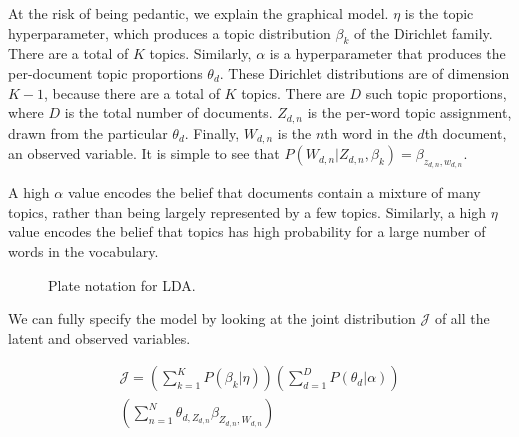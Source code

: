 \documentclass[letterpaper]{article}
\begin{document}
At the risk of being pedantic, we explain the graphical model. $\eta$
is the topic hyperparameter, which produces a topic distribution
$\beta_k$ of the Dirichlet family. There are a total of $K$ topics.
Similarly, $\alpha$ is a hyperparameter that produces the per-document
topic proportions $\theta_d$. These Dirichlet distributions are of
dimension $K-1$, because there are a total of $K$ topics. There are
$D$ such topic proportions, where $D$ is the total number of
documents. $Z_{d,n}$ is the per-word topic assignment, drawn from the
particular $\theta_d$. Finally, $W_{d,n}$ is the $n$th word in the
$d$th document, an observed variable. It is simple to see that
$P(W_{d,n} | Z_{d,n}, \beta_{k}) = \beta_{z_{d,n}, w_{d,n}}$.

A high $\alpha$ value encodes the belief that documents contain a
mixture of many topics, rather than being largely represented by a few
topics. Similarly, a high $\eta$ value encodes the belief that topics
has high probability for a large number of words in the vocabulary.

\begin{figure}[ht]
  \centering
  \caption{\label{fig:lda_plate} Plate notation for LDA.}
\end{figure}

We can fully specify the model by looking at the joint distribution
$\mathcal{J}$ of all the latent and observed variables.

\begin{multline}
 \mathcal{J} = \left( \sum_{k=1}^{K} P(\beta_k | \eta) \right) \left(
    \sum_{d=1}^{D} P(\theta_d | \alpha) \right) \\
  \left( \sum_{n=1}^{N} \theta_{d, Z_{d,n}} \beta_{Z_{d,n}, W_{d,n}} \right)  
\end{multline}
\end{document}
